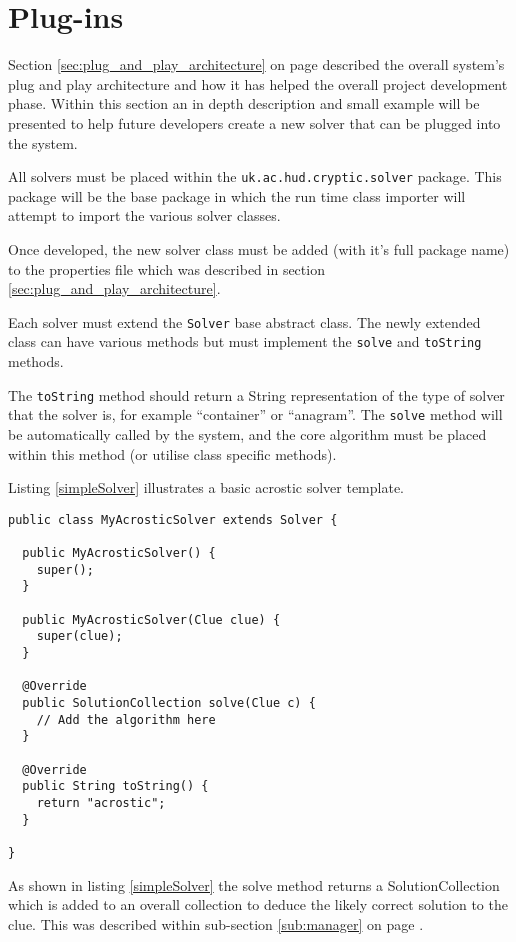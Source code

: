 \section{Plug-ins}
\label{sec:plugins}

Section \ref{sec:plug_and_play_architecture} on page
\pageref{sec:plug_and_play_architecture} described the overall system's plug and
play architecture and how it has helped the overall project development phase.
Within this section an in depth description and small example will be presented
to help future developers create a new solver that can be plugged into the
system.

All solvers must be placed within the \texttt{uk.ac.hud.cryptic.solver} package.
This package will be the base package in which the run time class importer will
attempt to import the various solver classes.

Once developed, the new solver class must be added (with it's full package name)
to the properties file which was described in section 
\ref{sec:plug_and_play_architecture}.

Each solver must extend the \texttt{Solver} base abstract class. The newly 
extended class can have various methods but must implement the \texttt{solve} 
and \texttt{toString} methods.

The \texttt{toString} method should return a String representation of the type 
of solver that the solver is, for example ``container'' or ``anagram''. The 
\texttt{solve} method will be automatically called by the system, and the core 
algorithm must be placed within this method (or utilise class specific methods).

Listing \ref{simpleSolver} illustrates a basic acrostic solver template.

\begin{lstlisting}[caption={An example user-defined solver}, label=simpleSolver]  
public class MyAcrosticSolver extends Solver {

  public MyAcrosticSolver() {
    super();
  }

  public MyAcrosticSolver(Clue clue) {
    super(clue);
  }

  @Override
  public SolutionCollection solve(Clue c) {
    // Add the algorithm here
  }

  @Override
  public String toString() {
    return "acrostic";
  }

}
\end{lstlisting}

As shown in listing \ref{simpleSolver} the solve method returns a 
SolutionCollection which is added to an overall collection to deduce the likely
correct solution to the clue. This was described within sub-section 
\ref{sub:manager} on page \pageref{sub:manager}.
